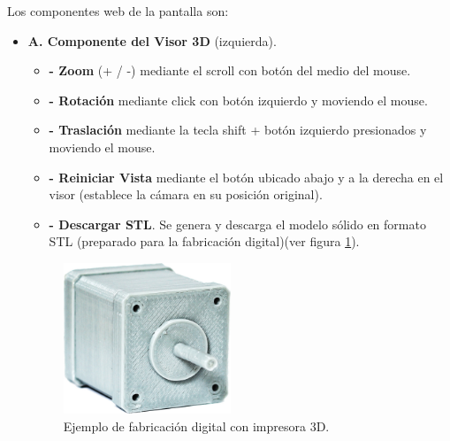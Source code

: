 Los componentes web de la pantalla son:
\begin{itemize}
\item \textbf{A. Componente del Visor 3D} (izquierda). \\


\begin{itemize}
\textbf{A1. Modelo 3D}. Se visualiza el modelo mediante OpenJSCAD y WebGL. Funcionalidades:\\
        \item \textbf{- Zoom} (+  / -) mediante el scroll con botón del medio del mouse.\\
        \item \textbf{- Rotación} mediante click con botón izquierdo y moviendo el mouse.\\
        \item \textbf{- Traslación} mediante la tecla shift + botón izquierdo presionados y moviendo el mouse.\\
         \item \textbf{- Reiniciar Vista} mediante el botón ubicado abajo y a la derecha en el visor (establece la cámara en su posición original).\\
        \item \textbf{- Descargar STL}. Se genera y descarga el modelo sólido en formato STL (preparado para la fabricación digital)(ver figura \ref{fig:impresion3d}).
        
\end{itemize}

\begin{figure}[ht]
    \includegraphics[width=5cm]{Img/Desarrollo/impresion3dc.jpg}
    \centering
    \caption{\footnotesize{Ejemplo de fabricación digital con impresora 3D.}}
     \label{fig:impresion3d}
\end{figure}


\end{itemize}
